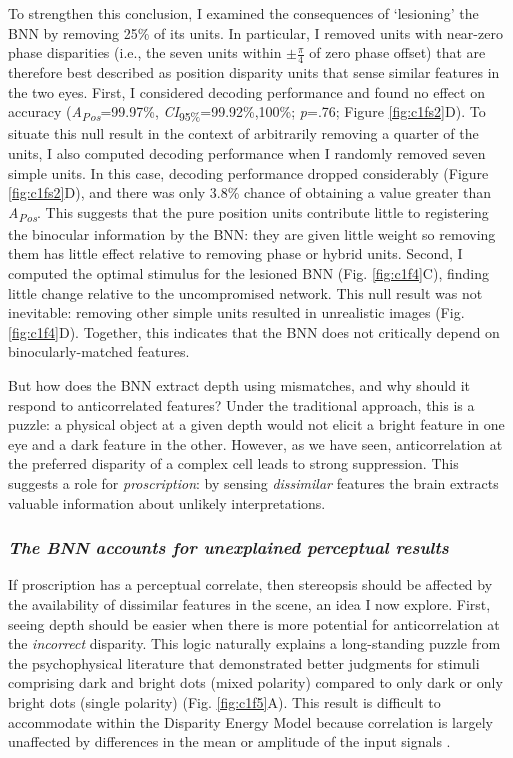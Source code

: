 {To strengthen this conclusion, I examined the consequences of `lesioning' the BNN by removing 25\% of its units. In particular, I removed units with near-zero phase disparities (i.e., the seven units within $\pm \frac{\pi}{4}$ of zero phase offset) that are therefore best described as position disparity units that sense similar features in the two eyes. First, I considered decoding performance and found no effect on accuracy ({\it A\textsubscript{Pos}}=99.97\%, {\it CI}\textsubscript{95\%}=99.92\%,100\%; {\it p}=.76; Figure \ref{fig:c1fs2}D). To situate this null result in the context of arbitrarily removing a quarter of the units, I also computed decoding performance when I randomly removed seven simple units. In this case, decoding performance dropped considerably (Figure \ref{fig:c1fs2}D), and there was only 3.8\% chance of obtaining a value greater than {\it A\textsubscript{Pos}}. This suggests that the pure position units contribute little to registering the binocular information by the BNN: they are given little weight so removing them has little effect relative to removing phase or hybrid units. Second, I computed the optimal stimulus for the lesioned BNN (Fig. \ref{fig:c1f4}C), finding little change relative to the uncompromised network. This null result was not inevitable: removing other simple units resulted in unrealistic images (Fig. \ref{fig:c1f4}D). Together, this indicates that the BNN does not critically depend on binocularly-matched features.

But how does the BNN extract depth using mismatches, and why should it respond to anticorrelated features? Under the traditional approach, this is a puzzle: a physical object at a given depth would not elicit a bright feature in one eye and a dark feature in the other. However, as we have seen, anticorrelation at the preferred disparity of a complex cell leads to strong suppression. This suggests a role for \emph {proscription}: by sensing \emph {dissimilar} features the brain extracts valuable information about unlikely interpretations.

\subsubsection*{\textit{The BNN accounts for unexplained perceptual results}}

 If proscription has a perceptual correlate, then stereopsis should be affected by the availability of dissimilar features in the scene, an idea I now explore. First, seeing depth should be easier when there is more potential for anticorrelation at the \emph {incorrect} disparity. This logic naturally explains a long-standing puzzle from the psychophysical literature \cite{Harris:1995va, Read:2011im} that demonstrated better judgments for stimuli comprising dark and bright dots (mixed polarity) compared to only dark or only bright dots (single polarity) (Fig. \ref{fig:c1f5}A). This result is difficult to accommodate within the Disparity Energy Model because correlation is largely unaffected by differences in the mean or amplitude of the input signals \cite{Read:2011im}.

}
